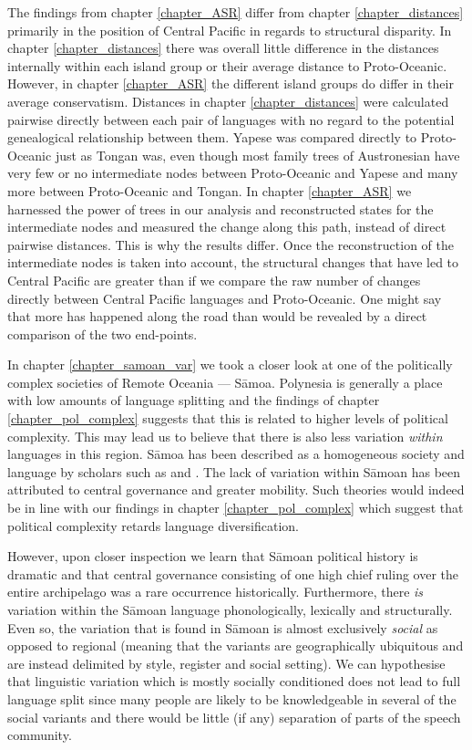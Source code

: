 \documentclass[draft,10pt]{article} %
\begin{document}
The findings from chapter \ref{chapter_ASR} differ from chapter \ref{chapter_distances} primarily in the position of Central Pacific in regards to structural disparity. In chapter \ref{chapter_distances} there was overall little difference in the distances internally within each island group or their average distance to Proto-Oceanic. However, in chapter \ref{chapter_ASR} the different island groups do differ in their average conservatism. Distances in chapter \ref{chapter_distances} were calculated pairwise directly between each pair of languages with no regard to the potential genealogical relationship between them. Yapese was compared directly to Proto-Oceanic just as Tongan was, even though most family trees of Austronesian have very few or no intermediate nodes between Proto-Oceanic and Yapese and many more between Proto-Oceanic and Tongan. In chapter \ref{chapter_ASR} we harnessed the power of trees in our analysis and reconstructed states for the intermediate nodes and measured the change along this path, instead of direct pairwise distances. This is why the results differ. Once the reconstruction of the intermediate nodes is taken into account, the structural changes that have led to Central Pacific are greater than if we compare the raw number of changes directly between Central Pacific languages and Proto-Oceanic. One might say that more has happened along the road than would be revealed by a direct comparison of the two end-points.

In chapter \ref{chapter_samoan_var} we took a closer look at one of the politically complex societies of Remote Oceania --- S\={a}moa. Polynesia is generally a place with low amounts of language splitting and the findings of chapter \ref{chapter_pol_complex} suggests that this is related to higher levels of political complexity. This may lead us to believe that there is also less variation \emph{within} languages in this region. S\={a}moa has been described as a homogeneous society and language by scholars such as \citet{mead1937samoans} and \citet{turner1884}. The lack of variation within S\={a}moan has been attributed to central governance and greater mobility. Such theories would indeed be in line with our findings in chapter \ref{chapter_pol_complex} which suggest that political complexity retards language diversification.

However, upon closer inspection we learn that S\={a}moan political history is dramatic and that central governance consisting of one high chief ruling over the entire archipelago was a rare occurrence historically. Furthermore, there \emph{is} variation within the S\={a}moan language phonologically, lexically and structurally. Even so, the variation that is found in S\={a}moan is almost exclusively \emph{social} as opposed to regional (meaning that the variants are  geographically ubiquitous and are instead delimited by style, register and social setting). We can hypothesise that linguistic variation which is mostly socially conditioned does not lead to full language split since many people are likely to be knowledgeable in several of the social variants and there would be little (if any) separation of parts of the speech community. 
\end{document}
